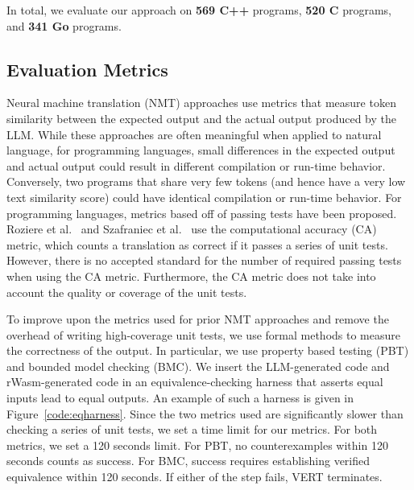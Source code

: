 \documentclass[12pt,openany,oneside,table]{cmuthesis}
\begin{document}
In total, we evaluate our approach on \textbf{569 C++} programs, \textbf{520 C} programs, and \textbf{341 Go} programs.


\subsection{Evaluation Metrics}
Neural machine translation (NMT) approaches use
metrics that measure token similarity between the expected output and the actual output produced by the LLM. While these approaches are often meaningful when applied to natural language, for programming languages, small differences in the expected output and actual output could result in different compilation or run-time behavior.
Conversely, two programs that share very few tokens (and hence have a very low text similarity score) could have identical compilation or run-time behavior.
For programming languages, metrics based off of passing tests have been proposed. Roziere et al.~\cite{roziere2020unsupervised} and Szafraniec
et al.~\cite{szafraniec2022code} use the computational accuracy (CA)
metric, which counts a translation as correct if it passes a series of
unit tests. However, there is no accepted standard for the
number of required passing tests when using the CA metric. Furthermore, the CA metric does not take into
account the quality or coverage of the unit tests.

To improve upon the metrics used for prior NMT approaches and remove the overhead of writing high-coverage unit tests, we use formal methods to measure the correctness of the output. In particular, we use property based testing (PBT) and bounded model checking (BMC). We insert the LLM-generated code and rWasm-generated code in an equivalence-checking harness that asserts equal inputs lead to equal outputs. An example of such a harness is given in Figure~\ref{code:eqharness}. 
Since the two metrics used are significantly
slower than checking a series of unit tests, we set a time limit for
our metrics. For both metrics, we set a 120 seconds limit. For
PBT, no counterexamples within 120 seconds counts as success. For BMC, success requires establishing verified equivalence within 120 seconds. If either of the step fails, VERT terminates.
\end{document}
